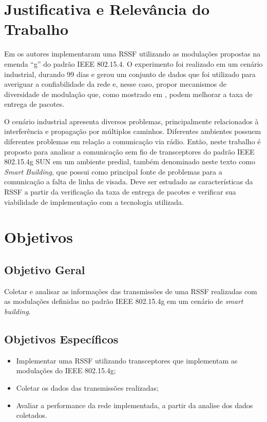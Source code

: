 \section{Justificativa e Relevância do Trabalho}
\label{sec:justificativa}
Em \cite{tuset2020dataset} os autores implementaram uma RSSF utilizando as modulações propostas na emenda ``g'' do padrão IEEE 802.15.4. O experimento foi realizado em um cenário industrial, durando 99 dias e gerou um conjunto de dados que foi utilizado para averiguar a confiabilidade da rede e, nesse caso, propor mecanismos de diversidade de modulação que, como mostrado em \cite{gomes2020improving}, podem melhorar a taxa de entrega de pacotes.

O cenário industrial apresenta diversos problemas, principalmente relacionados à interferência e propagação por múltiplos caminhos. Diferentes ambientes possuem diferentes problemas em relação a comunicação via rádio. Então, neste trabalho é proposto para analisar a comunicação sem fio de transceptores do padrão IEEE 802.15.4g SUN em um ambiente predial, também denominado neste texto como \emph{Smart Building}, que possui como principal fonte de problemas para a comunicação a falta de linha de visada. Deve ser estudado as características da RSSF a partir da verificação da taxa de entrega de pacotes e verificar sua viabilidade de implementação com a tecnologia utilizada.

\section{Objetivos}
\label{sec:objetivos}

\subsection{Objetivo Geral}
\label{subsec:objGeral}
Coletar e analisar as informações das transmissões de uma RSSF realizadas com as modulações definidas no padrão IEEE 802.15.4g em um cenário de \emph{smart building}.


\subsection{Objetivos Específicos}
\label{subsec:objespecificos}
\begin{itemize}
    \item Implementar uma RSSF utilizando transceptores que implementam as modulações do IEEE 802.15.4g;
    \item Coletar os dados das transmissões realizadas;
    \item Avaliar a performance da rede implementada, a partir da analise dos dados coletados. 
\end{itemize}


